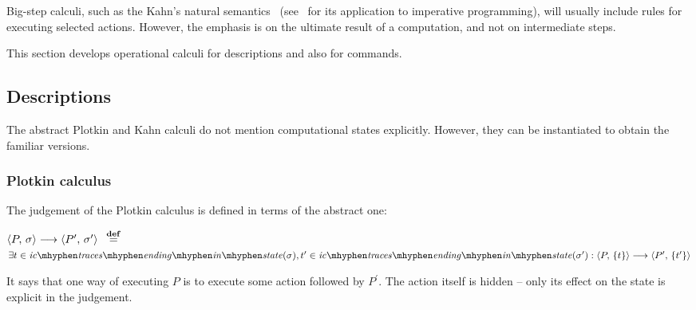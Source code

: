 \documentclass[a4paper,leqno]{llncs}
\newcommand{\mybox}[1]{\ensuremath{\text{\mbox{\ensuremath{#1}}}}}
\newcommand{\spacedwith}[2]{\ensuremath{\phantom{#2}#1\phantom{#2}}}
\newcommand{\primed}[1]{\ensuremath{#1^{\prime}}}
\newcommand{\defn}{\spacedwith{\stackrel{\mathbf{def}}{=}}{o}}
\newcommand{\config}[2]{\mybox{\langle {#1},\,{#2} \rangle}}
\newcommand{\plotkin}[4]{\mybox{\config{#1}{#2}\longrightarrow\config{#3}{#4}}}
\newcommand{\s}{\ensuremath{\sigma}}
\newcommand{\sprime}{\primed{\sigma}}
\newcommand{\trace}{\ensuremath{t}}
\newcommand{\tprime}{\primed{t}}
\newcommand{\icTracesEndingInState}[1]{\ensuremath{\mathit{ic\mhyphen traces\mhyphen ending\mhyphen in\mhyphen state}(#1)}}
\newcommand{\BEGINMYDEF}{\begin{trivlist}\item}
\newcommand{\ENDMYDEF}{\end{trivlist}}
\begin{document}
Big-step calculi, such as the Kahn's natural semantics~\cite{kahn87natural} (see~\cite{nielson99semantics} for its application to imperative programming), will usually include rules for executing selected actions. However, the emphasis is on the ultimate result of a computation, and not on intermediate steps.

This section develops operational calculi for descriptions and also for commands.

\subsection{Descriptions}
The abstract Plotkin and Kahn calculi do not mention computational states explicitly. However, they can be instantiated to obtain the familiar versions.
\subsubsection{Plotkin calculus}
The judgement of the Plotkin calculus is defined in terms of the abstract one:
\BEGINMYDEF
$\plotkin{P}{\s}{P^\prime}{\sprime} \defn$ \\$\exists \trace \in \icTracesEndingInState{\s}, \tprime \in \icTracesEndingInState{\sprime} : \plotkin{P}{\{\trace\}}{P^\prime}{\{\tprime\}}$
\ENDMYDEF
It says that one way of executing $P$ is to execute some action followed by $P^\prime$. The action itself is hidden -- only its effect on the state is explicit in the judgement.
\end{document}
